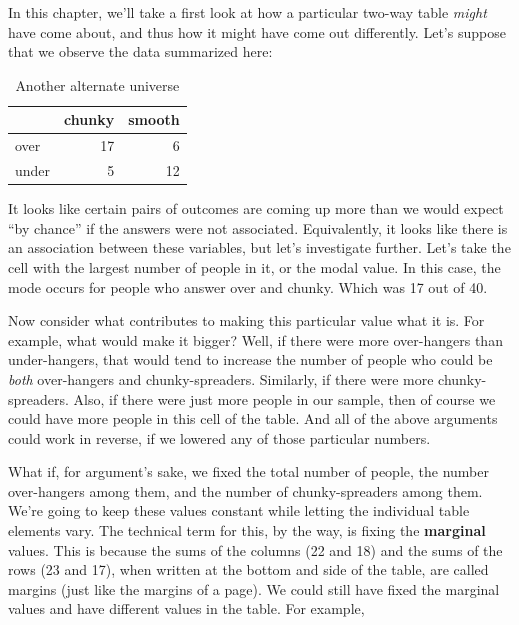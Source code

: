 \documentclass[
  openany]{book}
\begin{document}
In this chapter, we'll take a first look at how a particular two-way table \emph{might} have come about, and thus how it might have come out differently. Let's suppose that we observe the data summarized here:

\begin{table}[!h]

\caption{\label{tab:indep-sim}Another alternate universe}
\centering
\begin{tabular}[t]{lrr}
\toprule
  & chunky & smooth\\
\midrule
over & 17 & 6\\
under & 5 & 12\\
\bottomrule
\end{tabular}
\end{table}

It looks like certain pairs of outcomes are coming up more than we would expect ``by chance'' if the answers were not associated. Equivalently, it looks like there is an association between these variables, but let's investigate further. Let's take the cell with the largest number of people in it, or the modal value. In this case, the mode occurs for people who answer over and chunky. Which was 17 out of 40.

Now consider what contributes to making this particular value what it is. For example, what would make it bigger? Well, if there were more over-hangers than under-hangers, that would tend to increase the number of people who could be \emph{both} over-hangers and chunky-spreaders. Similarly, if there were more chunky-spreaders. Also, if there were just more people in our sample, then of course we could have more people in this cell of the table. And all of the above arguments could work in reverse, if we lowered any of those particular numbers.

What if, for argument's sake, we fixed the total number of people, the number over-hangers among them, and the number of chunky-spreaders among them. We're going to keep these values constant while letting the individual table elements vary. The technical term for this, by the way, is fixing the \textbf{marginal} values. This is because the sums of the columns (22 and 18) and the sums of the rows (23 and 17), when written at the bottom and side of the table, are called margins (just like the margins of a page). We could still have fixed the marginal values and have different values in the table. For example,
\end{document}
